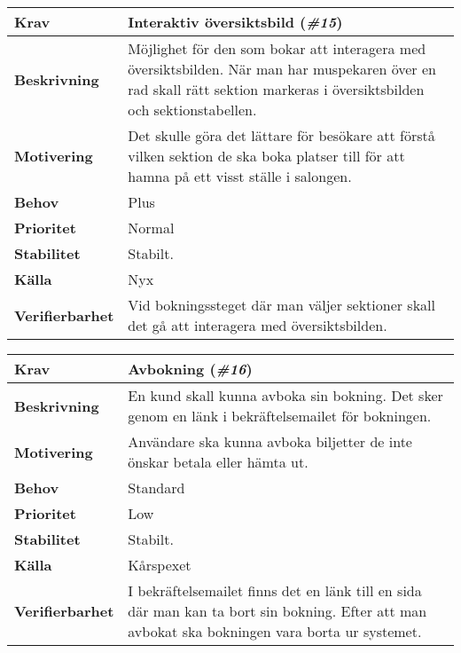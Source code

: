 \documentclass[a4paper, twoside, 11pt, titlepage]{article}
\begin{document}
	\begin{tabular} { p{2.6cm} p{12.5cm} }
		\hline
		\sffamily\textbf{Krav} & Interaktiv översiktsbild (\emph{\#15})  \\
		\hline
		\sffamily\textbf{Beskrivning} & Möjlighet för den som bokar att interagera med översiktsbilden. När man har muspekaren över en rad skall rätt sektion markeras i översiktsbilden och sektionstabellen.  \\
		\hline
		\sffamily\textbf{Motivering} & Det skulle göra det lättare för besökare att förstå vilken sektion de ska boka platser till för att hamna på ett visst ställe i salongen.  \\
		\hline
		\sffamily\textbf{Behov} & Plus  \\
		\hline
		\sffamily\textbf{Prioritet} & Normal  \\
		\hline
		\sffamily\textbf{Stabilitet} & Stabilt.  \\
		\hline
		\sffamily\textbf{Källa} & Nyx  \\
		\hline
		\sffamily\textbf{Verifierbarhet} & Vid bokningssteget där man väljer sektioner skall det gå att interagera med översiktsbilden.   \\
		\hline
	\end{tabular}
	\vspace{6mm}

	\begin{tabular} { p{2.6cm} p{12.5cm} }
		\hline
		\sffamily\textbf{Krav} & Avbokning (\emph{\#16})  \\
		\hline
		\sffamily\textbf{Beskrivning} & En kund skall kunna avboka sin bokning. Det sker genom en länk i bekräftelsemailet för bokningen.  \\
		\hline
		\sffamily\textbf{Motivering} & Användare ska kunna avboka biljetter de inte önskar betala eller hämta ut.  \\
		\hline
		\sffamily\textbf{Behov} & Standard  \\
		\hline
		\sffamily\textbf{Prioritet} & Low  \\
		\hline
		\sffamily\textbf{Stabilitet} & Stabilt.  \\
		\hline
		\sffamily\textbf{Källa} & Kårspexet  \\
		\hline
		\sffamily\textbf{Verifierbarhet} & I bekräftelsemailet finns det en länk till en sida där man kan ta bort sin bokning. Efter att man avbokat ska bokningen vara borta ur systemet.  \\
		\hline
	\end{tabular}
	\vspace{6mm}
\end{document}
